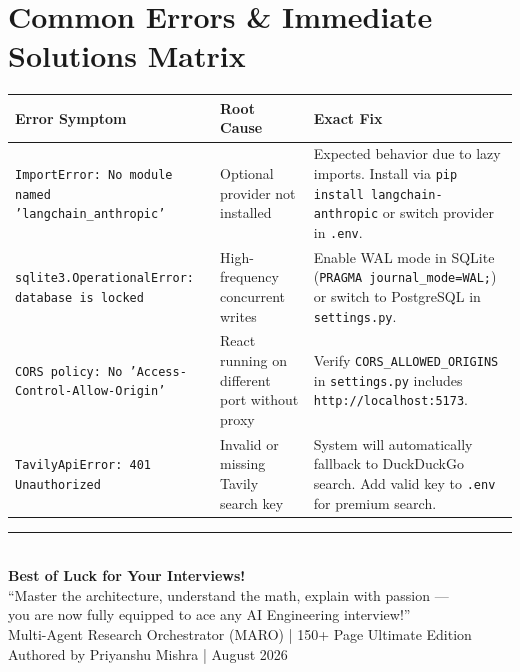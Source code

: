 \documentclass[11pt,a4paper,twoside]{report}
\begin{document}
\section{Common Errors \& Immediate Solutions Matrix}

\begin{center}
\begin{longtable}{|p{4cm}|p{4.5cm}|p{5cm}|}
\hline
\textbf{Error Symptom} & \textbf{Root Cause} & \textbf{Exact Fix} \\
\hline
\endhead
\texttt{ImportError: No module named 'langchain\_anthropic'} & Optional provider not installed & Expected behavior due to lazy imports. Install via \texttt{pip install langchain-anthropic} or switch provider in \texttt{.env}. \\
\hline
\texttt{sqlite3.OperationalError: database is locked} & High-frequency concurrent writes & Enable WAL mode in SQLite (\texttt{PRAGMA journal\_mode=WAL;}) or switch to PostgreSQL in \texttt{settings.py}. \\
\hline
\texttt{CORS policy: No 'Access-Control-Allow-Origin'} & React running on different port without proxy & Verify \texttt{CORS\_ALLOWED\_ORIGINS} in \texttt{settings.py} includes \texttt{http://localhost:5173}. \\
\hline
\texttt{TavilyApiError: 401 Unauthorized} & Invalid or missing Tavily search key & System will automatically fallback to DuckDuckGo search. Add valid key to \texttt{.env} for premium search. \\
\hline
\end{longtable}
\end{center}

\vfill
\begin{center}
\rule{0.6\textwidth}{1pt}\\[0.5cm]
{\Huge\bfseries\color{sectioncolor} Best of Luck for Your Interviews!}\\[0.4cm]
{\Large\color{purpleaccent} ``Master the architecture, understand the math, explain with passion ---}\\
{\Large\color{purpleaccent} you are now fully equipped to ace any AI Engineering interview!''}\\[0.3cm]
{\large\color{gray} Multi-Agent Research Orchestrator (MARO) | 150+ Page Ultimate Edition}\\[0.2cm]
{\small Authored by Priyanshu Mishra | August 2026}
\end{center}
\end{document}

